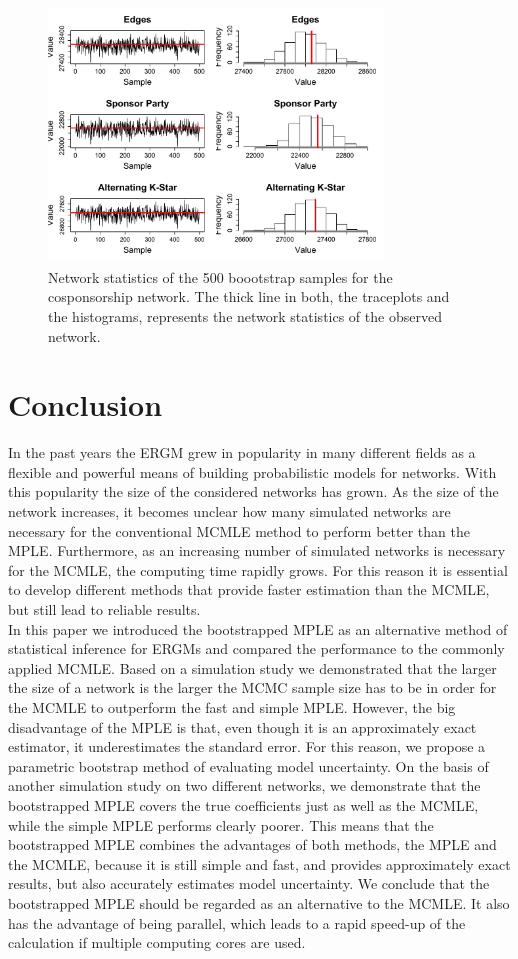 \documentclass[10pt, conference, compsocconf]{IEEEtran}
\begin{document}
\begin{figure}[!t]
\centering
\includegraphics[width=3.5in, height=2.7in]{MPLE_histogram_traceplot_cosponsorship}
\caption{Network statistics of the 500 boootstrap samples for the cosponsorship network. The thick line in both, the traceplots and the histograms, represents the network statistics of the observed network. }
\label{diagnostics}
\end{figure}

\section{Conclusion}
In the past years the ERGM grew in popularity in many different fields as a flexible and powerful means of building probabilistic models for networks. With this popularity the size of the considered networks has grown. As the size of the network increases, it becomes unclear how many simulated networks are necessary for the conventional MCMLE method to perform better than the MPLE. Furthermore, as an increasing number of simulated networks is necessary for the MCMLE, the computing time rapidly grows. For this reason it is essential to develop different methods that provide faster estimation than the MCMLE, but still lead to reliable results.\\
In this paper we introduced the bootstrapped MPLE as an alternative method of statistical inference for ERGMs and compared the performance to the commonly applied MCMLE. Based on a simulation study we demonstrated that the larger the size of a network is the larger the MCMC sample size has to be in order for the MCMLE to outperform the fast and simple MPLE. However, the big disadvantage of the MPLE is that, even though it is an approximately exact estimator, it underestimates the standard error. For this reason, we propose a parametric bootstrap method of evaluating model uncertainty. On the basis of another simulation study on two different networks, we demonstrate that the bootstrapped MPLE covers the true coefficients just as well as the MCMLE, while the simple MPLE performs clearly poorer. This means that the bootstrapped MPLE combines the advantages of both methods, the MPLE and the MCMLE, because it is still simple and fast, and provides approximately exact results, but also accurately estimates model uncertainty. We conclude that the bootstrapped MPLE should be regarded as an alternative to the MCMLE. It also has the advantage of being parallel, which leads to a rapid speed-up of the calculation if multiple computing cores are used.
\end{document}
